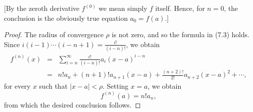 [By the zeroth derivative $f^{(0)}$ we mean simply $f$ itself. Hence, for $n = 0$, the conclusion is the obviously true equation $a_0 = f(a)$.]


\begin{proof}
The radius of convergence $\rho$ is not zero, and so the formula in (7.3) holds. Since $i(i-1) \cdots (i - n + 1) = \frac{i!}{(i-n)!}$, we obtain
\begin{eqnarray*}
f^{(n)}(x) &=& \sum_{i=n}^\infty \frac{i!}{(i - n)!} a_i (x - a)^{i-n} \\
               &=& n! a_n + (n + 1)! a_{n+1}(x - a) + \frac{(n+2)!}{2!} a_{n+2}(x - a)^2 + \cdots ,
\end{eqnarray*}
for every $x$ such that $|x-a| < \rho$. Setting $x = a$, we obtain
$$
f^{(n)}(a)= n!a_n, 
$$
from which the desired conclusion follows.
\end{proof}

